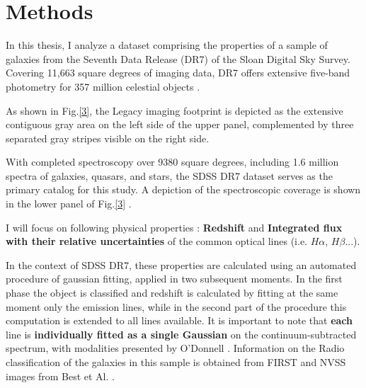 \chapter{Methods}
In this thesis, I analyze a dataset comprising the properties of a sample of galaxies from the Seventh Data Release (DR7) of the Sloan Digital Sky Survey. Covering 11,663 square degrees of imaging data, DR7 offers extensive five-band photometry for 357 million celestial objects \cite{2009ApJS..182..543A,mpa-sdss-dr7}. 

As shown in  Fig.\ref{3}, the Legacy imaging footprint is depicted as the extensive contiguous gray area on the left side of the upper panel, complemented by three separated gray stripes visible on the right side.

With completed spectroscopy over 9380 square degrees, including 1.6 million spectra of galaxies, quasars, and stars, the SDSS DR7 dataset serves as the primary catalog for this study. A depiction of the spectroscopic coverage is shown in the lower panel of Fig.\ref{3} .
 
I will focus on following physical properties : \textbf{Redshift} and \textbf{Integrated flux with their relative uncertainties} of the common optical lines (i.e. $H\alpha$, $H\beta$...).

In the context of SDSS DR7, these properties are calculated using an automated procedure of gaussian fitting, applied in two subsequent moments. In the first phase the object is classified and redshift is calculated by fitting at the same moment only the emission lines, while in the second part of the procedure this computation is extended to all lines available. It is important to note that \textbf{each} line is \textbf{individually fitted as a single Gaussian} on the continuum-subtracted spectrum, with modalities presented by O'Donnell \cite{1994ApJ...422..158O}. Information on the Radio classification of the galaxies in this sample is obtained from FIRST and NVSS images from Best et Al. \cite{2005MNRAS.362....9B}.

